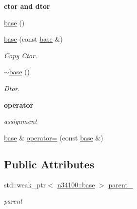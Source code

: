 \begin{Indent}{\bf ctor and dtor}\par
{\em \label{_amgrp98fbd3e5ae66fcd014fb744fec76c58d}
 }\begin{DoxyCompactItemize}
\item 
\hyperlink{classnebula_1_1content_1_1actor_1_1renderer_1_1base_a6d2371ae7900aae03442b5f592c44f34}{base} ()
\item 
\hyperlink{classnebula_1_1content_1_1actor_1_1renderer_1_1base_aaa23f00832374d2d2c81b524dafb65da}{base} (const \hyperlink{classnebula_1_1content_1_1actor_1_1renderer_1_1base}{base} \&)
\begin{DoxyCompactList}\small\item\em Copy Ctor. \item\end{DoxyCompactList}\item 
\hyperlink{classnebula_1_1content_1_1actor_1_1renderer_1_1base_a1d7ed21b51ac49eb5996355c1d4d095d}{$\sim$base} ()
\begin{DoxyCompactList}\small\item\em Dtor. \item\end{DoxyCompactList}\end{DoxyCompactItemize}
\end{Indent}
\begin{Indent}{\bf operator}\par
{\em \label{_amgrp4b583376b2767b923c3e1da60d10de59}
 assignment }\begin{DoxyCompactItemize}
\item 
\hyperlink{classnebula_1_1content_1_1actor_1_1renderer_1_1base}{base} \& \hyperlink{classnebula_1_1content_1_1actor_1_1renderer_1_1base_a8cb55e87ac866ad14c7e1d03077681a9}{operator=} (const \hyperlink{classnebula_1_1content_1_1actor_1_1renderer_1_1base}{base} \&)
\end{DoxyCompactItemize}
\end{Indent}
\subsection*{Public Attributes}
\begin{DoxyCompactItemize}
\item 
std::weak\_\-ptr$<$ \hyperlink{classnebula_1_1content_1_1actor_1_1admin_1_1base}{n34100::base} $>$ \hyperlink{classnebula_1_1content_1_1actor_1_1renderer_1_1base_a0c2ad46f284248c6fa9652263fe3e605}{parent\_\-}
\begin{DoxyCompactList}\small\item\em parent \item\end{DoxyCompactList}\end{DoxyCompactItemize}


